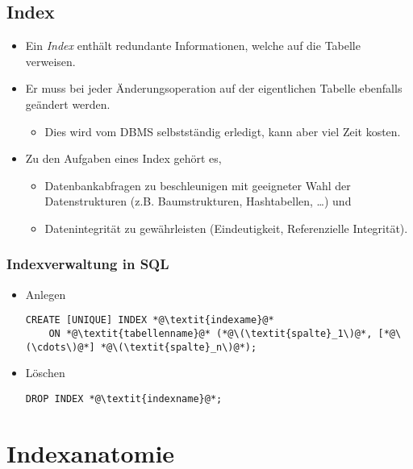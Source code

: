         \subsection{Index} %
            \begin{itemize}
            	\item Ein \textit{Index} enthält redundante Informationen, welche auf die Tabelle verweisen.
            	\item Er muss bei jeder Änderungsoperation auf der eigentlichen Tabelle ebenfalls geändert werden.
            		\begin{itemize}
            			\item Dies wird vom DBMS selbstständig erledigt, kann aber viel Zeit kosten.
            		\end{itemize}
            	\item Zu den Aufgaben eines Index gehört es,
            		\begin{itemize}
            			\item Datenbankabfragen zu beschleunigen mit geeigneter Wahl der Datenstrukturen (z.B. Baumstrukturen, Hashtabellen, \dots) und
            			\item Datenintegrität zu gewährleisten (Eindeutigkeit, Referenzielle Integrität).
            		\end{itemize}
            \end{itemize}

            \subsubsection{Indexverwaltung in SQL} %
            	\begin{itemize}
            		\item Anlegen
	                    \begin{lstlisting}
CREATE [UNIQUE] INDEX *@\textit{indexame}@*
	ON *@\textit{tabellenname}@* (*@\(\textit{spalte}_1\)@*, [*@\(\cdots\)@*] *@\(\textit{spalte}_n\)@*);
	                    \end{lstlisting}
	                \item Löschen
	                	\begin{lstlisting}
DROP INDEX *@\textit{indexname}@*;
	                	\end{lstlisting}
                \end{itemize}

    \section{Indexanatomie} %
